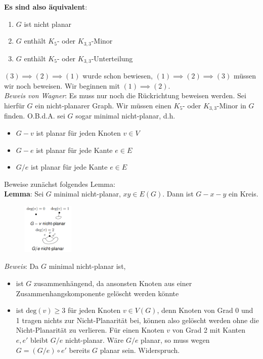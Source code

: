 \textbf{Es sind also äquivalent}:
\begin{enumerate}
	\item $G$ ist nicht planar
	\item $G$ enthält $K_5$- oder $K_{3,3}$-Minor
	\item $G$ enthält $K_5$- oder $K_{3,3}$-Unterteilung
\end{enumerate}

$(3)\implies(2)\implies(1)$ wurde schon bewiesen, $(1)\implies(2)\implies(3)$ müssen wir noch beweisen. Wir beginnen mit $(1)\implies(2)$.\\

\textit{Beweis von Wagner}: Es muss nur noch die Rückrichtung beweisen werden. Sei hierfür $G$ ein nicht-planarer Graph. Wir müssen einen $K_5$- oder $K_{3,3}$-Minor in $G$ finden. O.B.d.A. sei $G$ sogar minimal nicht-planar, d.h.
\begin{itemize}
	\item $G-v$ ist planar für jeden Knoten $v\in V$
	\item $G-e$ ist planar für jede Kante $e\in E$
	\item $G/e$ ist planar für jede Kante $e\in E$
\end{itemize}

Beweise zunächst folgendes Lemma:\\

\textbf{Lemma}: Sei $G$ minimal nicht-planar, $xy\in E(G)$. Dann ist $G-x-y$ ein Kreis.

\begin{figure}
	\centering
	\vspace{30pt}
	\includegraphics[width=0.22\textwidth]{images/wagner-1.png}
	\vspace{40pt}
	\vspace{-60pt}
\end{figure}
\textit{Beweis}: Da $G$ minimal nicht-planar ist,
\begin{itemize}
	\item ist $G$ zusammenhängend, da ansonsten Knoten aus einer Zusammenhangskomponente gelöscht werden könnte
	\item ist $\text{deg}(v)\geq 3$ für jeden Knoten $v\in V(G)$, denn Knoten von Grad 0 und 1 tragen nichts zur Nicht-Planarität bei, können also gelöscht werden ohne die Nicht-Planarität zu verlieren. Für einen Knoten $v$ von Grad 2 mit Kanten $e, e'$ bleibt $G/e$ nicht-planar. Wäre $G/e$ planar, so muss wegen $G = (G/e) \circ e'$ bereits $G$ planar sein. Widerspruch.
\end{itemize}

